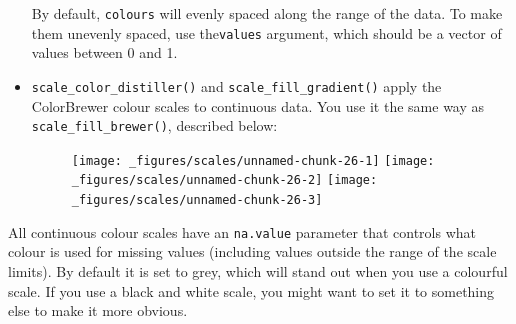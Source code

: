 \begin{itemize}
  By default, \texttt{colours} will evenly spaced along the range of the
  data. To make them unevenly spaced, use the\texttt{values} argument,
  which should be a vector of values between 0 and 1.
\item
  \texttt{scale\_color\_distiller()} and
  \texttt{scale\_fill\_gradient()} apply the ColorBrewer colour scales
  to continuous data. You use it the same way as
  \texttt{scale\_fill\_brewer()}, described below:

\begin{Shaded}
\begin{Highlighting}[]
\StringTok{ }\NormalTok{()}
\StringTok{ }\NormalTok{(} \NormalTok{)}
\StringTok{ }\NormalTok{(} \NormalTok{)}
\end{Highlighting}
\end{Shaded}

  \begin{figure}[H]
    \texttt{[image: \_figures/scales/unnamed-chunk-26-1]}%
    \texttt{[image: \_figures/scales/unnamed-chunk-26-2]}%
    \texttt{[image: \_figures/scales/unnamed-chunk-26-3]}
  \end{figure}
\end{itemize}

All continuous colour scales have an \texttt{na.value} parameter that
controls what colour is used for missing values (including values
outside the range of the scale limits). By default it is set to grey,
which will stand out when you use a colourful scale. If you use a black
and white scale, you might want to set it to something else to make it
more obvious.  

\begin{Shaded}
\begin{Highlighting}[]
\StringTok{ }\NormalTok{(} \NormalTok{, } \NormalTok{:}\NormalTok{, } \NormalTok{(}\NormalTok{, }\NormalTok{, }\NormalTok{, }\NormalTok{, }\NormalTok{))}
\StringTok{ }\StringTok{ }\NormalTok{(}\NormalTok{(}  \NormalTok{)}
\StringTok{ }\NormalTok{(} \NormalTok{)}
\StringTok{ }\NormalTok{(} \NormalTok{, } \NormalTok{, } \NormalTok{)}
\end{Highlighting}
\end{Shaded}

